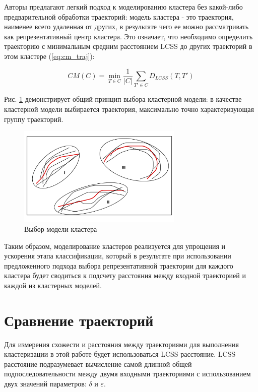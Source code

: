 Авторы \cite{inproceedings:7_related_work} предлагают легкий подход к моделированию кластера без какой-либо предварительной обработки траекторий: модель кластера - это траектория, наименее всего удаленная от других, в результате чего ее можно рассматривать как репрезентативный центр кластера. Это означает, что необходимо определить траекторию с минимальным средним расстоянием LCSS до других траекторий в этом кластере (\ref{eq:cm_traj}):

\begin{equation} \label{eq:cm_traj}
	CM(C) = \min\limits_{T \in C} \frac{1}{|C|} \sum_{T' \in C} D_{LCSS}(T, T')
\end{equation}

Рис. \ref{fig:cm-modeling} демонстрирует общий принцип выбора кластерной модели: в качестве кластерной модели выбирается траектория, максимально точно характеризующая группу траекторий.

\begin{figure}[!htb]
	\centering{}
	\includegraphics[width=0.7\textwidth]{images/cm-modeling.png}
	\caption{Выбор модели кластера}
	\label{fig:cm-modeling}
\end{figure}

Таким образом, моделирование кластеров реализуется для упрощения и ускорения этапа классификации, который в результате при использовании предложенного подхода выбора репрезентативной траектории для каждого кластера будет сводиться к подсчету расстояния между входной траекторией и каждой из кластерных моделей.

\section{Сравнение траекторий}

Для измерения схожести и расстояния между траекториями для выполнения кластеризации в этой работе будет использоваться LCSS расстояние. LCSS расстояние подразумевает вычисление самой длинной общей подпоследовательности между двумя входными траекториями с использованием двух значений параметров: $\delta$ и $\varepsilon$.


